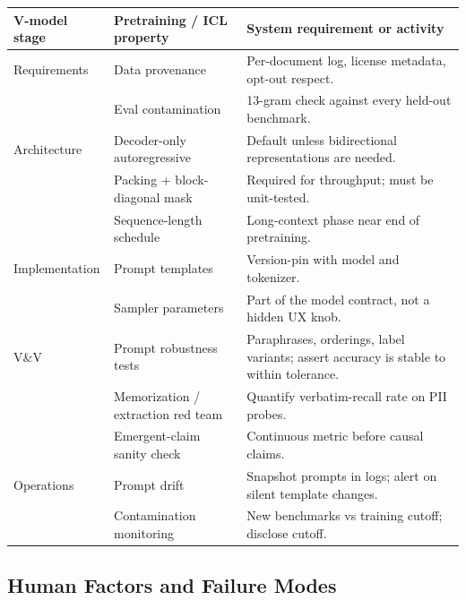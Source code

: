 \begin{center}
\begin{tabular}{|p{3.4cm}|p{3.4cm}|p{6.8cm}|}
\hline
V-model stage & Pretraining / ICL property & System requirement or activity \\
\hline
Requirements & Data provenance & Per-document log, license metadata,
   opt-out respect. \\
 & Eval contamination & 13-gram check against every held-out
   benchmark. \\
\hline
Architecture & Decoder-only autoregressive
             & Default unless bidirectional representations are
               needed. \\
 & Packing + block-diagonal mask
             & Required for throughput; must be unit-tested. \\
 & Sequence-length schedule & Long-context phase near end of
   pretraining. \\
\hline
Implementation & Prompt templates & Version-pin with model and
   tokenizer. \\
 & Sampler parameters & Part of the model contract,
   not a hidden UX knob. \\
\hline
V\&V & Prompt robustness tests & Paraphrases, orderings, label
   variants; assert accuracy is stable to within tolerance. \\
 & Memorization / extraction red team
     & Quantify verbatim-recall rate on PII probes. \\
 & Emergent-claim sanity check & Continuous metric before
   causal claims. \\
\hline
Operations & Prompt drift & Snapshot prompts in logs; alert on
   silent template changes. \\
 & Contamination monitoring & New benchmarks vs training
   cutoff; disclose cutoff. \\
\hline
\end{tabular}
\end{center}

\subsection{Human Factors and Failure Modes}

